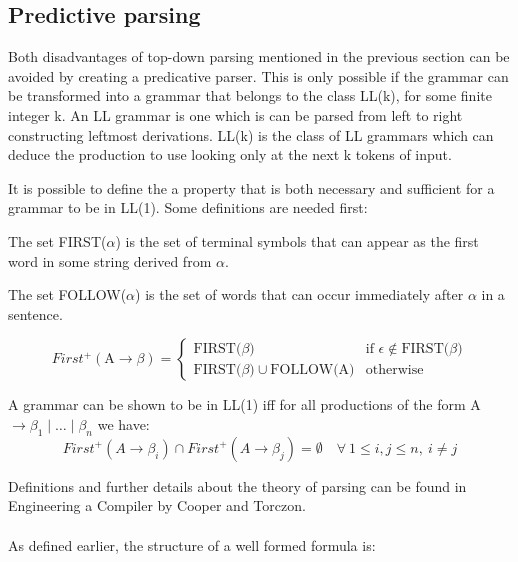 \subsection{Predictive parsing}

Both disadvantages of top-down parsing mentioned in the previous section can be avoided by creating a predicative parser. This is only possible if the grammar can be transformed into a grammar that belongs to the class LL(k), for some finite integer k. An LL grammar is one which is can be parsed from left to right constructing leftmost derivations.  LL(k) is the class of LL grammars which can deduce the production to use looking only at the next k tokens of input. 

It is possible to define the a property that is both necessary and sufficient for a grammar to be in LL(1). Some definitions are needed first:

\begin{FIRST}

The set FIRST($\alpha$) is the set of terminal symbols that can appear as the first word in some string derived from $\alpha$.
\end{FIRST}
\begin{FOLLOW}
The set FOLLOW($\alpha$) is the set of words that can occur immediately after $\alpha$ in a sentence.
\end{FOLLOW}

\begin{FIRST+}

\[
First^{+} (\text{A} \to \beta) = 
  \begin{cases}
   \text{FIRST(}\beta \text{)} & \text{if } \epsilon \notin \text{FIRST(}\beta \text{)} \\
  \text{FIRST(}\beta \text{)} \cup \text{FOLLOW(A)} & \text{otherwise}
  \end{cases}
\]

\end{FIRST+}

\noindent A grammar can be shown to be in LL(1) iff for all productions of the form A $ \to \beta_1 \mid \ldots \mid \beta_n $ we have: 
\begin{equation}
 First^{+} (A \to \beta_i) \cap First^{+} (A \to \beta_j) = \emptyset \quad \forall \: 1 \le i,j \le n, \: i \not= j 
\end{equation}

\noindent Definitions and further details about the theory of parsing can be found in Engineering a Compiler by Cooper and Torczon. \cite{cooper2011engineering}\\
\\
\noindent As defined earlier, the structure of a well formed formula is: 

